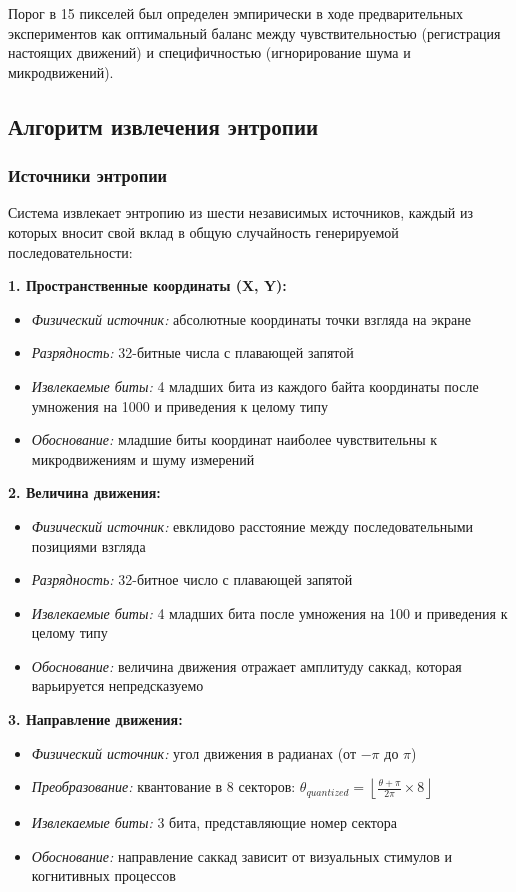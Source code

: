 \documentclass[14pt, a4paper]{extreport}
\begin{document}
Порог в 15 пикселей был определен эмпирически в ходе предварительных экспериментов как оптимальный баланс между чувствительностью (регистрация настоящих движений) и специфичностью (игнорирование шума и микродвижений).

\subsection{Алгоритм извлечения энтропии}

\subsubsection{Источники энтропии}

Система извлекает энтропию из шести независимых источников, каждый из которых вносит свой вклад в общую случайность генерируемой последовательности:

\textbf{1. Пространственные координаты (X, Y):}
\begin{itemize}
    \item \textit{Физический источник:} абсолютные координаты точки взгляда на экране
    \item \textit{Разрядность:} 32-битные числа с плавающей запятой
    \item \textit{Извлекаемые биты:} 4 младших бита из каждого байта координаты после умножения на 1000 и приведения к целому типу
    \item \textit{Обоснование:} младшие биты координат наиболее чувствительны к микродвижениям и шуму измерений
\end{itemize}

\textbf{2. Величина движения:}
\begin{itemize}
    \item \textit{Физический источник:} евклидово расстояние между последовательными позициями взгляда
    \item \textit{Разрядность:} 32-битное число с плавающей запятой
    \item \textit{Извлекаемые биты:} 4 младших бита после умножения на 100 и приведения к целому типу
    \item \textit{Обоснование:} величина движения отражает амплитуду саккад, которая варьируется непредсказуемо
\end{itemize}

\textbf{3. Направление движения:}
\begin{itemize}
    \item \textit{Физический источник:} угол движения в радианах (от $-\pi$ до $\pi$)
    \item \textit{Преобразование:} квантование в 8 секторов: $\theta_{quantized} = \left\lfloor \frac{\theta + \pi}{2\pi} \times 8 \right\rfloor$
    \item \textit{Извлекаемые биты:} 3 бита, представляющие номер сектора
    \item \textit{Обоснование:} направление саккад зависит от визуальных стимулов и когнитивных процессов
\end{itemize}
\end{document}
